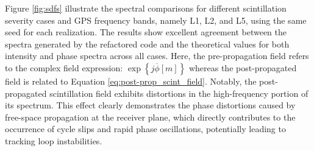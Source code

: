 Figure \ref{fig:sdfs} illustrate the spectral comparisons for different scintillation severity cases and GPS frequency bands, namely L1, L2, and L5, using the same seed for each realization. The results show excellent agreement between the spectra generated by the refactored code and the theoretical values for both intensity and phase spectra across all cases. Here, the pre-propagation field refers to the complex field expression: $\exp\left\{ j \overline{\phi} \left[ m \right] \right\}$ whereas the post-propagated field is related to Equation \eqref{eq:post-prop_scint_field}. Notably, the post-propagated scintillation field exhibits distortions in the high-frequency portion of its spectrum. This effect clearly demonstrates the phase distortions caused by free-space propagation at the receiver plane, which directly contributes to the occurrence of cycle slips and rapid phase oscillations, potentially leading to tracking loop instabilities.
